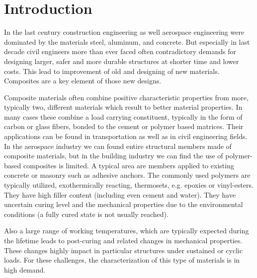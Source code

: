 \section*{Introduction}
\indent

In the last century construction engineering as well aerospace engineering  were dominated by the materials steel, aluminum, and concrete. But especially in last decade civil engineers more than ever faced often contradictory demands for designing larger, safer and more durable structures at shorter time and lower costs. This lead to improvement of old and designing of new materials. Composites are a key element of those new designs.

Composite materials often combine positive characteristic properties from more, typically two, different materials which result to better material properties. In many cases these combine a load carrying constituent, typically in the form of carbon or glass fibers, bonded to the cement or polymer based matrices. Their applications can be found in transportation as well as in civil engineering fields. In the aerospace industry we can found entire structural members made of composite materials, but in the building industry we can find the use of polymer-based composites is limited. A typical area are members applied to existing concrete or masonry such as adhesive anchors. The commonly used polymers are typically utilized, exothermically reacting, thermosets, e.g. epoxies or vinyl-esters. They have high filler content (including even cement and water). They have uncertain curing level and the mechanical properties due to the environmental conditions (a fully cured state is not usually reached).

Also a large range of working temperatures, which are typically expected during the lifetime leads to post-curing and related changes in mechanical properties. These changes highly impact in particular structures under sustained or cyclic loads. For these challenges, the characterization of this type of materials is in high demand.  